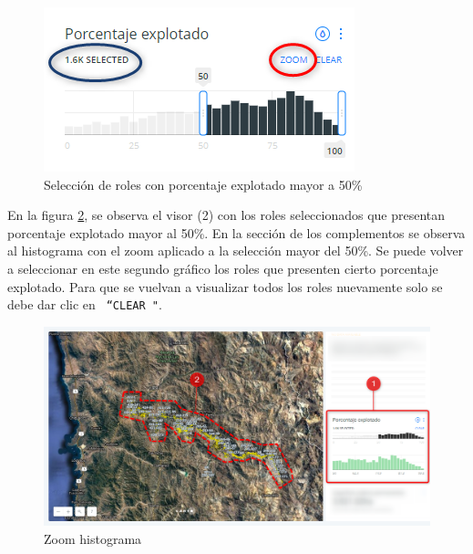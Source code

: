 \documentclass[10pt]{article}
\begin{document}
\begin{figure}[H]
\centering
\includegraphics[scale=1.2]{Figuras_manual/selec_rol_histo2.png}
\caption{Selección de roles con porcentaje explotado mayor a 50\%}
\label{16}
\end{figure}

En la figura \ref{17}, se observa el visor (2) con los roles seleccionados que presentan porcentaje explotado mayor al 50\%. En la sección de los complementos se observa al histograma con el zoom aplicado a la selección mayor del 50\%. Se puede volver a seleccionar en este segundo gráfico los roles que presenten cierto porcentaje explotado. Para que se vuelvan a visualizar todos los roles nuevamente solo se debe dar clic en \texttt{ “CLEAR "}.


\begin{figure}[H]
\centering
\includegraphics[scale=0.5]{Figuras_manual/filtro_histo.png}
\caption{Zoom histograma}
\label{17}
\end{figure}
\end{document}
